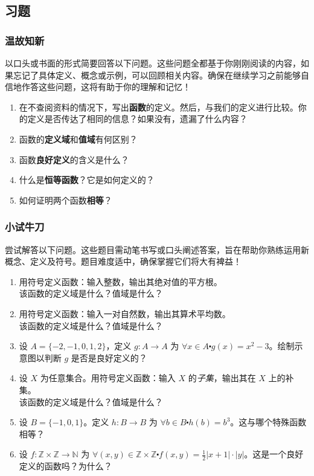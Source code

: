 
\subsection{习题}

\subsubsection*{温故知新}

以口头或书面的形式简要回答以下问题。这些问题全都基于你刚刚阅读的内容，如果忘记了具体定义、概念或示例，可以回顾相关内容。确保在继续学习之前能够自信地作答这些问题，这将有助于你的理解和记忆！

\begin{enumerate}[label=(\arabic*)]
    \item 在不查阅资料的情况下，写出\textbf{函数}的定义。然后，与我们的定义进行比较。你的定义是否传达了相同的信息？如果没有，遗漏了什么内容？
    \item 函数的\textbf{定义域}和\textbf{值域}有何区别？
    \item 函数\textbf{良好定义}的含义是什么？
    \item 什么是\textbf{恒等函数}？它是如何定义的？
    \item 如何证明两个函数\textbf{相等}？
\end{enumerate}

\subsubsection*{小试牛刀}

尝试解答以下问题。这些题目需动笔书写或口头阐述答案，旨在帮助你熟练运用新概念、定义及符号。题目难度适中，确保掌握它们将大有裨益！

\begin{enumerate}[label=(\arabic*)]
    \item 用符号定义函数：输入整数，输出其绝对值的平方根。\\
          该函数的定义域是什么？值域是什么？
    \item 用符号定义函数：输入一对自然数，输出其算术平均数。\\
          该函数的定义域是什么？值域是什么？
    \item 设 $A = \{-2, -1, 0, 1, 2\}$，定义 $g : A \to A$ 为 $\forall x \in A \centerdot g(x) = x^2 - 3$。绘制示意图以判断 $g$ 是否是良好定义的？
    \item 设 $X$ 为任意集合。用符号定义函数：输入 $X$ 的\emph{子集}，输出其在 $X$ 上的补集。\\
          该函数的定义域是什么？值域是什么？
    \item 设 $B = \{-1, 0, 1\}$。定义 $h : B \to B$ 为 $\forall b \in B \centerdot h(b) = b^3$。这与哪个特殊函数相等？
    \item 设 $f : \mathbb{Z} \times \mathbb{Z} \to \mathbb{N}$ 为 $\forall (x, y) \in \mathbb{Z} \times \mathbb{Z} \centerdot f(x, y) = \frac{1}{2}|x + 1| \cdot |y|$。这是一个良好定义的函数吗？为什么？
\end{enumerate}